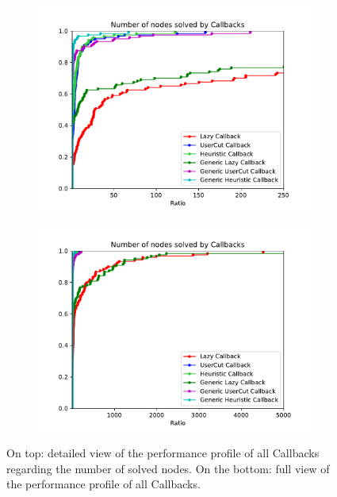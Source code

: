 \begin{figure}[h!]
  \centering
  \begin{subfigure}[b]{0.97\linewidth}
    \includegraphics[width=\linewidth]{media/NodesAll.pdf}
  \end{subfigure}
  \begin{subfigure}[b]{0.97\linewidth}
  \ContinuedFloat
    \includegraphics[width=\linewidth]{media/NodesAll1.pdf}
  \end{subfigure}
  \caption{On top: detailed view of the performance profile of all Callbacks regarding the number of solved nodes. On the bottom: full view of the performance profile of all Callbacks.}
       \label{fig:allcallnodes}
\end{figure}

